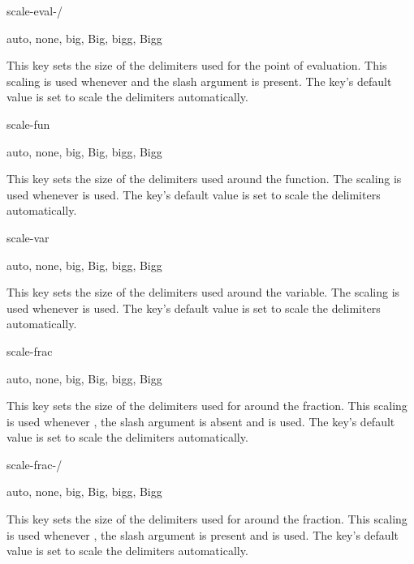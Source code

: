 	\begin{option}{scale-eval-/}
		\begin{values}[default = auto]
			auto, none, big, Big, bigg, Bigg
		\end{values}
		This key sets the size of the delimiters used for the point of evaluation. This scaling is used whenever  and the slash argument is present. The key's default value is set to scale the delimiters automatically.
	\end{option}
	
	\begin{option}{scale-fun}
		\begin{values}[default = auto]
			auto, none, big, Big, bigg, Bigg
		\end{values}
		This key sets the size of the delimiters used around the function. The scaling is used whenever  is used. The key's default value is set to scale the delimiters automatically.
	\end{option}
	
	\begin{option}{scale-var}
		\begin{values}[default = auto]
			auto, none, big, Big, bigg, Bigg
		\end{values}
		This key sets the size of the delimiters used around the variable. The scaling is used whenever  is used. The key's default value is set to scale the delimiters automatically.
	\end{option}
	
	\begin{option}{scale-frac}
		\begin{values}[default = auto]
			auto, none, big, Big, bigg, Bigg
		\end{values}
		This key sets the size of the delimiters used for around the fraction. This scaling is used whenever , the slash argument is absent and  is used. The key's default value is set to scale the delimiters automatically.
	\end{option}
	
	\begin{option}{scale-frac-/}
		\begin{values}[default = auto]
			auto, none, big, Big, bigg, Bigg
		\end{values}
		This key sets the size of the delimiters used for around the fraction. This scaling is used whenever , the slash argument is present and  is used. The key's default value is set to scale the delimiters automatically.
	\end{option}
	
